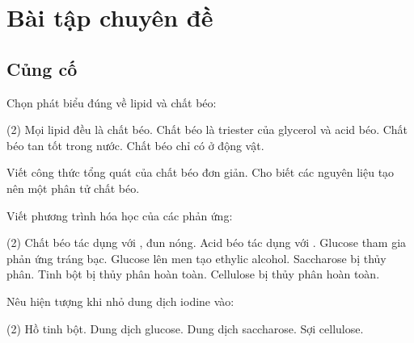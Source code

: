 \section{Bài tập chuyên đề}

\subsection{Củng cố}

\begin{tuluyen}
Chọn phát biểu đúng về lipid và chất béo:
\begin{tasks}(2)
\task Mọi lipid đều là chất béo.
\task Chất béo là triester của glycerol và acid béo.
\task Chất béo tan tốt trong nước.
\task Chất béo chỉ có ở động vật.
\end{tasks}
\end{tuluyen}

\begin{tuluyen}
Viết công thức tổng quát của chất béo đơn giản. Cho biết các nguyên liệu tạo nên một phân tử chất béo.
\end{tuluyen}

\begin{tuluyen}
Viết phương trình hóa học của các phản ứng:
\begin{tasks}(2)
\task Chất béo tác dụng với , đun nóng.
\task Acid béo  tác dụng với .
\task Glucose tham gia phản ứng tráng bạc.
\task Glucose lên men tạo ethylic alcohol.
\task Saccharose bị thủy phân.
\task Tinh bột bị thủy phân hoàn toàn.
\task Cellulose bị thủy phân hoàn toàn.
\end{tasks}
\end{tuluyen}

\begin{tuluyen}
Nêu hiện tượng khi nhỏ dung dịch iodine vào:
\begin{tasks}(2)
\task Hồ tinh bột.
\task Dung dịch glucose.
\task Dung dịch saccharose.
\task Sợi cellulose.
\end{tasks}
\end{tuluyen}

